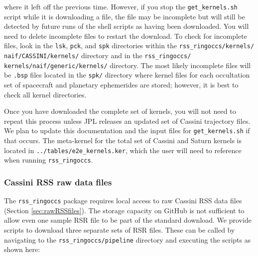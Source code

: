 \documentclass[titlepage, 12pt]{article}
\begin{document}
            where it left off the previous time.
            However, if you stop the
            \texttt{get\_kernels.sh} script while it
            is downloading a file, the file may be
            incomplete but will still be detected by
            future runs of the shell scripts as having been downloaded.
            You will need to delete incomplete files to restart
            the download. To check for incomplete files,
            look in the \texttt{lsk}, \texttt{pck},
            and \texttt{spk} directories within the
            \texttt{rss\_ringoccs/kernels/%
                    naif/CASSINI/kernels/}
            directory and in the
            \texttt{rss\_ringoccs/%
                    kernels/naif/generic/kernels/}
            directory. The most likely incomplete files
            will be \texttt{.bsp} files located in the
            \texttt{spk/} directory where kernel files for each
            occultation set of spacecraft and planetary
            ephemerides are stored; however, it is best to
            check all kernel directories.
            \par\hfill\par
            Once you have downloaded the complete
            set of kernels, you will not need to repeat
            this process unless JPL releases an updated set of
            Cassini trajectory files. We plan to update this
            documentation and the input files for
            \texttt{get\_kernels.sh} if that occurs.
            The meta-kernel for the total set of Cassini
            and Saturn kernels is located in
            \texttt{../tables/e2e\_kernels.ker},
            which the user will need to reference when running
            \texttt{rss\_ringoccs}.
        \subsubsection{Cassini RSS raw data files}
            \label{sec:getRSR}
            The \texttt{rss\_ringoccs}
            package requires local access to
            raw Cassini RSS data files
            (Section \ref{sec:rawRSSfiles}).
            The storage capacity on GitHub
            is not sufficient to allow
            even one sample RSR file to be part of the
            standard download. We provide scripts to download three separate
            sets of RSR files.
       These can be called by navigating to the \texttt{rss\_ringoccs/pipeline} directory and executing the scripts as shown here:\\
           
\end{document}
